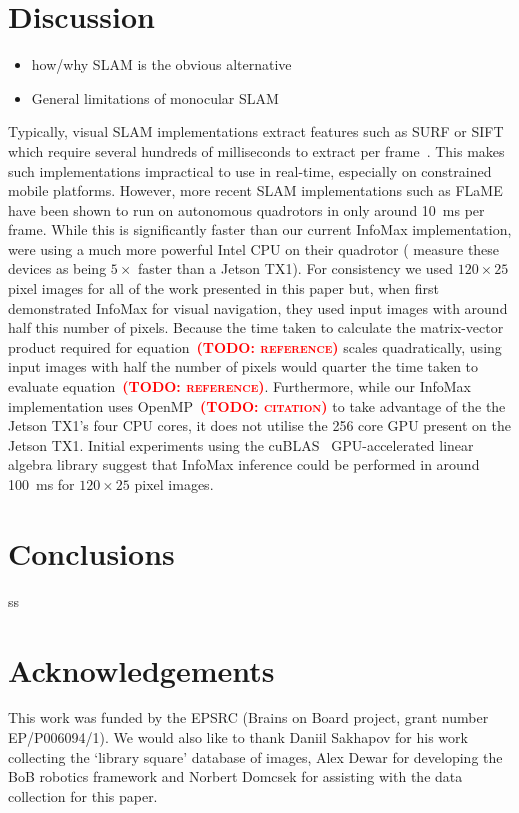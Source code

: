 \documentclass[letterpaper]{article}
\newcommand{\todo}[1]{\textbf{\textsc{\textcolor{red}{(TODO: #1)}}}}
\begin{document}
\section{Discussion}
\begin{itemize}
    \item how/why SLAM is the obvious alternative
    \item General limitations of monocular SLAM
\end{itemize}
Typically, visual SLAM implementations extract features such as SURF or SIFT which require several hundreds of milliseconds to extract per frame~\citep{Bay2006}. 
This makes such implementations impractical to use in real-time, especially on constrained mobile platforms. 
However, more recent SLAM implementations such as FLaME~\citep{Greene2017} have been shown to run on autonomous quadrotors in only around \SI{10}{\milli\second} per frame. 
While this is significantly faster than our current InfoMax implementation, \citet{Greene2017} were using a much more powerful Intel CPU on their quadrotor (\citet{Biddulph2018} measure these devices as being $5\times$ faster than a Jetson TX1). 
For consistency we used $120 \times 25$ pixel images for all of the work presented in this paper but, when \citet{Baddeley2012} first demonstrated InfoMax for visual navigation, they used input images with around half this number of pixels.
Because the time taken to calculate the matrix-vector product required for equation~\todo{reference} scales quadratically, using input images with half the number of pixels would quarter the time taken to evaluate equation~\todo{reference}.
Furthermore, while our InfoMax implementation uses OpenMP~\todo{citation} to take advantage of the the Jetson TX1's four CPU cores, it does not utilise the \num{256} core GPU present on the Jetson TX1.
Initial experiments using the cuBLAS~\citep{NVIDIACorporation2007} GPU-accelerated linear algebra library suggest that InfoMax inference could be performed in around \SI{100}{\milli\second} for $120 \times 25$ pixel images.

\section{Conclusions}
ss
\section{Acknowledgements}
This work was funded by the EPSRC (Brains on Board project, grant number EP/P006094/1).
We would also like to thank Daniil Sakhapov for his work collecting the `library square' database of images, Alex Dewar for developing the BoB robotics framework and Norbert Domcsek for assisting with the data collection for this paper. 

\footnotesize

\end{document}
